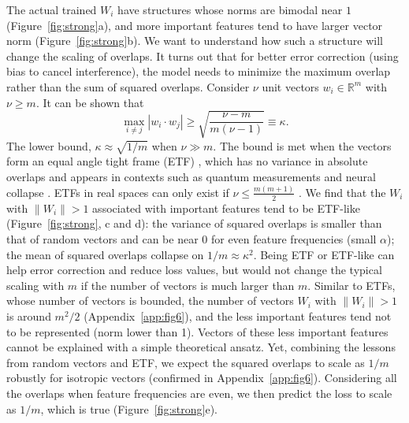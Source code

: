 \documentclass{article}
\begin{document}
The actual trained $W_i$ have structures whose norms are bimodal near $1$ (Figure~\ref{fig:strong}a), and more important features tend to have larger vector norm (Figure~\ref{fig:strong}b). We want to understand how such a structure will change the scaling of overlaps. It turns out that for better error correction (using bias to cancel interference), the model needs to minimize the maximum overlap rather than the sum of squared overlaps. Consider $\nu$ unit vectors $w_i \in \mathbb{R}^m$ with $\nu \ge m$. It can be shown that \cite{welch1974lower}
\begin{equation}
    \max_{i\neq j} | w_i \cdot w_j | \ge \sqrt{\frac{\nu - m}{m (\nu -1)}} \equiv \kappa.
\end{equation}
The lower bound, $\kappa \approx \sqrt{1/m}$ when $\nu \gg m$. The bound is met when the vectors form an equal angle tight frame (ETF) \cite{casazza2012survey,strohmer2003grassmannian,fickus2012real}, which has no variance in absolute overlaps and appears in contexts such as quantum measurements \cite{renes2004symmetric,liu2021relating,liu2021quantifying,liu2022total} and neural collapse \cite{papyan2020prevalence,tirer2022extended}. ETFs in real spaces can only exist if $\nu \le \frac{m(m+1)}{2}$ \cite{casazza2012survey,strohmer2003grassmannian,fickus2012real}. We find that the $W_i$ with $\|W_i\| > 1$ associated with important features tend to be ETF-like (Figure~\ref{fig:strong}, c and d): the variance of squared overlaps is smaller than that of random vectors and can be near 0 for even feature frequencies (small $\alpha$); the mean of squared overlaps collapse on $1/m \approx \kappa^2$. 
Being ETF or ETF-like can help error correction and reduce loss values, but would not change the typical scaling with $m$ if the number of vectors is much larger than $m$. Similar to ETFs, whose number of vectors is bounded, the number of vectors $W_i$ with $\|W_i\| > 1$ is around $m^2/2$ (Appendix~\ref{app:fig6}), and the less important features tend not to be represented (norm lower than 1). Vectors of these less important features cannot be explained with a simple theoretical ansatz. Yet, combining the lessons from random vectors and ETF, we expect the squared overlaps to scale as $1/m$ robustly for isotropic vectors (confirmed in Appendix~\ref{app:fig6}). Considering all the overlaps when feature frequencies are even, we then predict the loss to scale as $1/m$, which is true (Figure~\ref{fig:strong}e).
\end{document}
